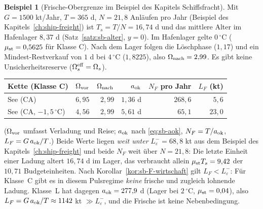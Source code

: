 \documentclass[a4paper, 12pt, twoside, openright]{report}
\theoremstyle{definition}
\theoremstyle{definition}
\newtheorem{beispiel}{Beispiel}[chapter]
\begin{document}
\begin{beispiel}[Frische-Obergrenze im Beispiel des Kapitels Schiffsfracht]\label{bsp:sb-LF}
Mit $G=1500$ kt/Jahr, $T=365$ d, $N=21{,}8$ Anläufen pro Jahr (Beispiel des Kapitels~\ref{ch:ship-freight}) ist
$T_s=T/N=16{,}74$ d und das mittlere Alter im Hafenlager $8{,}37$ d (Satz~\ref{satz:sb-alter}, $y=0$). Im
Hafenlager gelte $0\,{}^\circ$C ($\mu_{\rm st}=0{,}5625$ für Klasse C). Nach dem Lager folgen die Löschphase
($1{,}17$) und ein Mindest-Restverkauf von $1$ d bei $4\,{}^\circ$C ($1{,}8225$), also $\Omega_{\rm nach}=2{,}99$.
Es gibt keine Unsicherheitsreserve ($\Omega_s^{\rm eff}=\Omega_s$).
\begin{center}
\begin{tabular}{lrrrrr}
\toprule
Kette (Klasse C) & $\Omega_{\rm vor}$ & $\Omega_{\rm nach}$ & $a_{\rm ok}$ & $N_F$ pro Jahr & $L_F$ (kt)\\
\midrule
See (CA)                      & $6{,}95$ & $2{,}99$ & $1{,}36$ d & $268{,}6$ & $5{,}6$\\
See (CA, $-1{,}5\,{}^\circ$C)  & $4{,}56$ & $2{,}99$ & $5{,}61$ d & $65{,}1$  & $23{,}0$\\
\bottomrule
\end{tabular}
\end{center}
($\Omega_{\rm vor}$ umfasst Verladung und Reise; $a_{\rm ok}$ nach \eqref{eq:sb-aok}, $N_F=T/a_{\rm ok}$,
$L_F=G\,a_{\rm ok}/T$.) Beide Werte liegen \emph{weit unter} $L_\varepsilon^-=68{,}8$ kt aus dem
Beispiel des Kapitels~\ref{ch:ship-freight} und beide $N_F$ weit über $N=21{,}8$: Die letzte Einheit
einer Ladung altert $16{,}74$ d im Lager, das verbraucht allein $\mu_{\rm st}T_s=9{,}42$ der $10{,}71$ Budgeteinheiten.
Nach Korollar~\ref{kor:sb-F-wirtschaft} gilt $L_F<L_\varepsilon^-$: Für Klasse~C gibt es in diesem
Pulsregime \emph{keine} frische und zugleich lohnende Ladung. Klasse~L hat dagegen
$a_{\rm ok}=277{,}9$ d (Lager bei $2\,{}^\circ$C, $\mu_{\rm st}=0{,}04$), also $L_F=G\,a_{\rm ok}/T\approx1142$ kt
$\gg L_\varepsilon^-$, und die Frische ist keine Nebenbedingung.
\end{beispiel}
\end{document}
